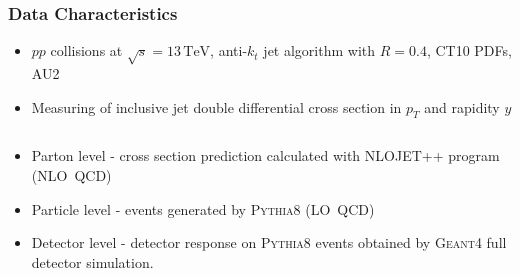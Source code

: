\documentclass[compress]{beamer}
\newcommand{\TeV}{\,\text{TeV}}
\newcommand{\pt}{p_{T}}
\begin{document}
\begin{frame}
\frametitle{Data Characteristics}
\begin{itemize}
  \item $pp$ collisions at $\sqrt{s}=13\TeV$, anti-$k_t$ jet algorithm with
    $R=0.4$, CT10 PDFs, AU2
  \item Measuring of inclusive jet double differential cross section in $\pt$
    and rapidity $y$ \end{itemize}
\begin{columns}[onlytextwidth]
  \begin{column}{0.5\textwidth}
\begin{itemize}
  \item Parton level - cross section prediction calculated with NLOJET++ program
    (NLO~QCD)
  \item Particle level - events generated by \textsc{Pythia8} (LO~QCD)
  \item Detector level - detector response on \textsc{Pythia8} events obtained
    by \textsc{Geant4} full detector simulation. 
\end{itemize}
  \end{column}
  \begin{column}{0.5\textwidth}
\begin{figure}[b]
  \centering
  \texttt{[image: \{../PrezentationATLASmeeting/DataChar]}.png}
\end{figure}
  \end{column}
\end{columns}
\end{frame}
\end{document}
